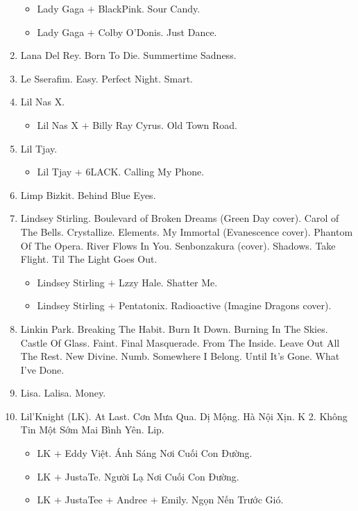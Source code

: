 \documentclass{article}
\begin{document}
\begin{enumerate}
	\begin{itemize}
		\item {\sc Lady Gaga $+$ BlackPink.} Sour Candy.
		\item {\sc Lady Gaga $+$ Colby O'Donis.} Just Dance.
	\end{itemize}
	\item {\sc Lana Del Rey.} Born To Die. Summertime Sadness.
	\item {\sc Le Sserafim.} Easy. Perfect Night. Smart.
	\item {\sc Lil Nas X.}
	\begin{itemize}
		\item {\sc Lil Nas X $+$ Billy Ray Cyrus.} Old Town Road.
	\end{itemize}
	\item {\sc Lil Tjay.}
	\begin{itemize}
		\item {\sc Lil Tjay $+$ 6LACK.} Calling My Phone.
	\end{itemize}
	\item {\sc Limp Bizkit.} Behind Blue Eyes.
	\item {\sc Lindsey Stirling.} Boulevard of Broken Dreams (Green Day cover). Carol of The Bells. Crystallize. Elements. My Immortal (Evanescence cover). Phantom Of The Opera. River Flows In You. Senbonzakura (cover). Shadows. Take Flight. Til The Light Goes Out.
	\begin{itemize}
		\item {\sc Lindsey Stirling $+$ Lzzy Hale.} Shatter Me.
		\item {\sc Lindsey Stirling $+$ Pentatonix.} Radioactive (Imagine Dragons cover).
	\end{itemize}
	\item {\sc Linkin Park.} Breaking The Habit. Burn It Down. Burning In The Skies. Castle Of Glass. Faint. Final Masquerade. From The Inside. Leave Out All The Rest. New Divine. Numb. Somewhere I Belong. Until It's Gone. What I've Done.
	\item {\sc Lisa.} Lalisa. Money.
	\item {\sc Lil'Knight (LK).} At Last. Cơn Mưa Qua. Dị Mộng. Hà Nội Xịn. K 2. Không Tin Một Sớm Mai Bình Yên. Lip.
	\begin{itemize}
		\item {\sc LK $+$ Eddy Việt.} Ánh Sáng Nơi Cuối Con Đường.
		\item {\sc LK $+$ JustaTe.} Người Lạ Nơi Cuối Con Đường.
		\item {\sc LK $+$ JustaTee $+$ Andree $+$ Emily.} Ngọn Nến Trước Gió.

\end{itemize}
\end{enumerate}
\end{document}
